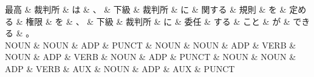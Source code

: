 \documentclass[tikz,border=5pt]{standalone}
\begin{document}
\normalsize
\begin{dependency}[edge unit distance=12.0pt]
    \begin{deptext}[column sep=1em]
        最高 \& 裁判所 \& は \& 、 \& 下級 \& 裁判所 \& に \& 関する \& 規則 \& を \& 定める \& 権限 \& を \& 、 \& 下級 \& 裁判所 \& に \& 委任 \& する \& こと \& が \& できる \& 。\\
        NOUN \& NOUN \& ADP \& PUNCT \& NOUN \& NOUN \& ADP \& VERB \& NOUN \& ADP \& VERB \& NOUN \& ADP \& PUNCT \& NOUN \& NOUN \& ADP \& VERB \& AUX \& NOUN \& ADP \& AUX \& PUNCT\\
    \end{deptext}
\end{dependency}
\end{document}
